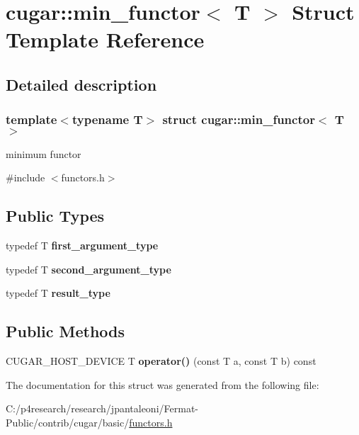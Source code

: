 \hypertarget{structcugar_1_1min__functor}{}\section{cugar\+:\+:min\+\_\+functor$<$ T $>$ Struct Template Reference}
\label{structcugar_1_1min__functor}


\subsection{Detailed description}
\subsubsection*{template$<$typename T$>$\newline
struct cugar\+::min\+\_\+functor$<$ T $>$}

minimum functor 

{\ttfamily \#include $<$functors.\+h$>$}

\subsection*{Public Types}
\begin{DoxyCompactItemize}
\item 
\mbox{\label{structcugar_1_1min__functor_a2ab81ea4cb5ba4768a1e8421ea824b35}} 
typedef T {\bfseries first\+\_\+argument\+\_\+type}
\item 
\mbox{\label{structcugar_1_1min__functor_a81488ed7c0e83f240b61f3d4a1ac24b9}} 
typedef T {\bfseries second\+\_\+argument\+\_\+type}
\item 
\mbox{\label{structcugar_1_1min__functor_ab4ae681489545cc9918076103492af76}} 
typedef T {\bfseries result\+\_\+type}
\end{DoxyCompactItemize}
\subsection*{Public Methods}
\begin{DoxyCompactItemize}
\item 
\mbox{\label{structcugar_1_1min__functor_a743fad7448948c9f6837640cdd6808e3}} 
C\+U\+G\+A\+R\+\_\+\+H\+O\+S\+T\+\_\+\+D\+E\+V\+I\+CE T {\bfseries operator()} (const T a, const T b) const
\end{DoxyCompactItemize}


The documentation for this struct was generated from the following file\+:\begin{DoxyCompactItemize}
\item 
C\+:/p4research/research/jpantaleoni/\+Fermat-\/\+Public/contrib/cugar/basic/\hyperlink{functors_8h}{functors.\+h}\end{DoxyCompactItemize}
